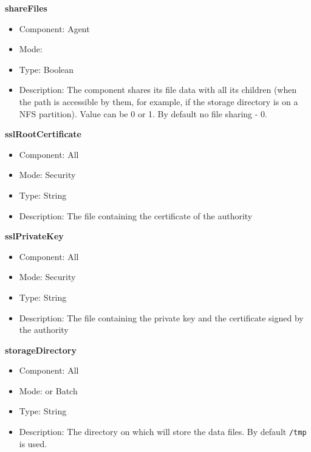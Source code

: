 \begin{description}
\item{\bf{shareFiles}}
  \begin{itemize}
  \item Component: Agent
  \item Mode: \dagda
  \item Type: Boolean
  \item Description: The \dagda component shares its file data with all its children
(when the path is accessible by them, for example, if the storage directory is
on a NFS partition). Value can be 0 or 1.  By default no file sharing - 0.
  \end{itemize}
  

\item{\bf{sslRootCertificate} \label{appendix_ssl}}
  \begin{itemize}
  \item Component: All
  \item Mode: Security
  \item Type: String
  \item Description: The file containing the certificate of the authority
  \end{itemize}
  
\item{\bf{sslPrivateKey}}
  \begin{itemize}
  \item Component: All
  \item Mode: Security
  \item Type: String
  \item Description: The file containing the private key and the certificate signed by the authority
  \end{itemize}
  

\item{\bf{storageDirectory}}
  \begin{itemize}
  \item Component: All
  \item Mode: \dagda or Batch
  \item Type: String
  \item Description: The directory on which \dagda will store the data files.
  By default \texttt{/tmp} is used.
  \end{itemize}



\end{description}
